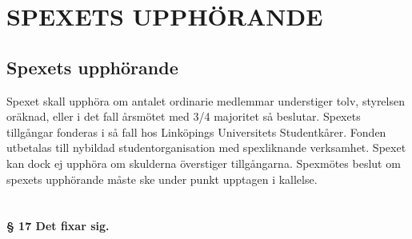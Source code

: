\documentclass[a4paper]{article}
\begin{document}
\section{SPEXETS UPPHÖRANDE}
\subsection{Spexets upphörande}
Spexet skall upphöra om antalet ordinarie medlemmar understiger tolv, styrelsen oräknad, eller i det fall årsmötet med 3/4 majoritet så beslutar. Spexets tillgångar fonderas i så fall hos Linköpings Universitets Studentkårer. Fonden utbetalas till nybildad studentorganisation med spexliknande verksamhet. Spexet kan dock ej upphöra om skulderna överstiger tillgångarna. Spexmötes beslut om spexets upphörande måste ske under punkt upptagen i kallelse.

\setcounter{section}{16}
\section{ }
\textbf{§ 17 Det fixar sig.}
\end{document}
